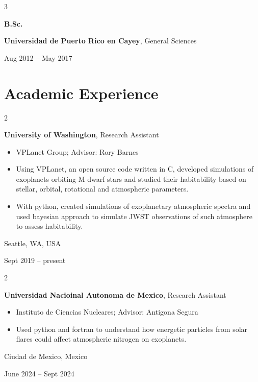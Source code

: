 \documentclass[10pt, letterpaper]{article}
\newenvironment{highlights}{
    \begin{itemize}[
        topsep=0.10 cm,
        parsep=0.10 cm,
        partopsep=0pt,
        itemsep=0pt,
        leftmargin=0.4 cm + 10pt
    ]
}{
    \end{itemize}
} %
\newenvironment{twocolentry}[2][]{
    \onecolentry
    \def\secondColumn{#2}
    \setcolumnwidth{\fill, 4.5 cm}
    \begin{paracol}{2}
}{
    \switchcolumn \raggedleft \secondColumn
    \end{paracol}
    \endonecolentry
} %
\newenvironment{threecolentry}[3][]{
    \onecolentry
    \def\thirdColumn{#3}
    \setcolumnwidth{1 cm, \fill, 4.5 cm}
    \begin{paracol}{3}
    {\raggedright #2} \switchcolumn
}{
    \switchcolumn \raggedleft \thirdColumn
    \end{paracol}
    \endonecolentry
} %
\begin{document}
        \vspace{0.2 cm}

        \begin{threecolentry}{\textbf{B.Sc.}}{
            Aug 2012 – May 2017
        }
            \textbf{Universidad de Puerto Rico en Cayey}, General Sciences
        \end{threecolentry}


    
    \section{Academic Experience}



        
        \begin{twocolentry}{
            Seattle, WA, USA

        Sept 2019 – present
        }
            \textbf{University of Washington}, Research Assistant
            \begin{highlights}
                \item VPLanet Group; Advisor: Rory Barnes
                \item Using VPLanet, an open source code written in C, developed simulations of exoplanets orbiting M dwarf stars and studied their habitability based on stellar, orbital, rotational and atmospheric parameters.
                \item With python, created simulations of exoplanetary atmospheric spectra and used bayesian approach to simulate JWST observations of such atmosphere to assess habitability.
            \end{highlights}
        \end{twocolentry}


        \vspace{0.2 cm}

        \begin{twocolentry}{
            Ciudad de Mexico, Mexico

        June 2024 – Sept 2024
        }
            \textbf{Universidad Nacioinal Autonoma de Mexico}, Research Assistant
            \begin{highlights}
                \item Instituto de Ciencias Nucleares; Advisor: Antigona Segura
                \item Used python and fortran to understand how energetic particles from solar flares could affect atmospheric nitrogen on exoplanets.
            \end{highlights}
        \end{twocolentry}
\end{document}
